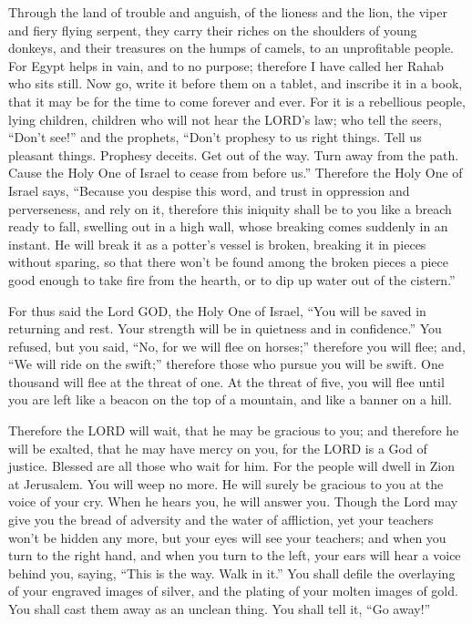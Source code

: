 Through the land of trouble and anguish, of the lioness and the lion, the viper and fiery
flying serpent, they carry their riches on the shoulders of young donkeys, and their treasures on the
humps of camels, to an unprofitable people.
\myverse{}For Egypt helps in vain, and to no purpose; therefore I have called her Rahab
who sits still.
\myverse{}Now go, write it before them on a tablet, and inscribe it in a book, that it
may be for the time to come forever and ever.
\myverse{}For it is a rebellious people, lying children, children who will not hear the
LORD’s law;
\myverse{}who tell the seers, “Don’t see!” and the prophets, “Don’t prophesy to us
right things. Tell us pleasant things. Prophesy deceits.
\myverse{}Get out of the way. Turn away from the path. Cause the Holy One of Israel
to cease from before us.”
\myverse{}Therefore the Holy One of Israel says, “Because you despise this word, and
trust in oppression and perverseness, and rely on it,
\myverse{}therefore this iniquity shall be to you like a breach ready to fall, swelling
out in a high wall, whose breaking comes suddenly in an instant.
\myverse{}He will break it as a potter’s vessel is broken, breaking it in pieces without
sparing, so that there won’t be found among the broken pieces a piece good enough to take fire from the
hearth, or to dip up water out of the cistern.”

\myverse{}For thus said the Lord GOD, the Holy One of Israel, “You will
be saved in returning and rest. Your strength will be in quietness and in confidence.” You refused,
\myverse{}but you said, “No, for we will flee on horses;” therefore you will flee;
and, “We will ride on the swift;” therefore those who pursue you will be swift.
\myverse{}One thousand will flee at the threat of one. At the threat of five, you will
flee until you are left like a beacon on the top of a mountain, and like a banner on a hill.

\myverse{}Therefore the LORD will wait, that he may be gracious to you;
and therefore he will be exalted, that he may have mercy on you, for the LORD is a God of justice. Blessed
are all those who wait for him.
\myverse{}For the people will dwell in Zion at Jerusalem. You will weep no more. He
will surely be gracious to you at the voice of your cry. When he hears you, he will answer you.
\myverse{}Though the Lord may give you the bread of adversity and the water of affliction,
yet your teachers won’t be hidden any more, but your eyes will see your teachers;
\myverse{}and when you turn to the right hand, and when you turn to the left, your
ears will hear a voice behind you, saying, “This is the way. Walk in it.”
\myverse{}You shall defile the overlaying of your engraved images of silver, and the
plating of your molten images of gold. You shall cast them away as an unclean thing. You shall tell it,
“Go away!”

